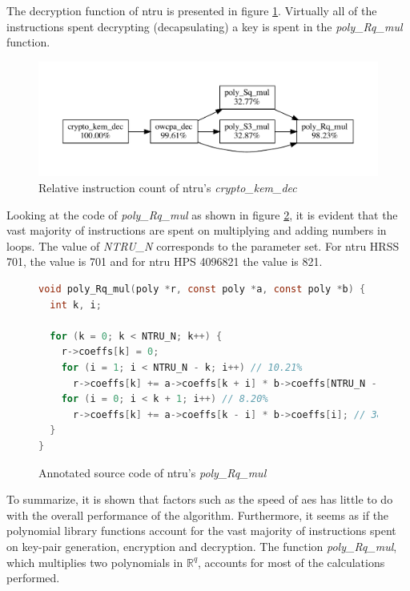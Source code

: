 The decryption function of \gls{ntru} is presented in figure \ref{figure:result:hot-paths:ntru:crypto_kem_dec}. Virtually all of the instructions spent decrypting (decapsulating) a key is spent in the \textit{poly\_Rq\_mul} function.

\begin{figure}[H]
    \centering
    \includegraphics[scale=0.5]{chapters/results/hot-paths/ntru/crypto_kem_dec.pdf}
    \caption{Relative instruction count of \gls{ntru}'s \textit{crypto\_kem\_dec}}
    \label{figure:result:hot-paths:ntru:crypto_kem_dec}
\end{figure}

Looking at the code of \textit{poly\_Rq\_mul} as shown in figure \ref{figure:result:hot-paths:ntru:poly_Rq_mul}, it is evident that the vast majority of instructions are spent on multiplying and adding numbers in loops. The value of \textit{NTRU\_N} corresponds to the parameter set. For \gls{ntru} HRSS 701, the value is 701 and for \gls{ntru} HPS 4096821 the value is 821.

\begin{figure}[H]
    \centering
    \begin{lstlisting}[language=C]
void poly_Rq_mul(poly *r, const poly *a, const poly *b) {
  int k, i;

  for (k = 0; k < NTRU_N; k++) {
    r->coeffs[k] = 0;
    for (i = 1; i < NTRU_N - k; i++) // 10.21%
      r->coeffs[k] += a->coeffs[k + i] * b->coeffs[NTRU_N - i]; // 42.75%
    for (i = 0; i < k + 1; i++) // 8.20%
      r->coeffs[k] += a->coeffs[k - i] * b->coeffs[i]; // 38.79%
  }
}
    \end{lstlisting}
    \caption{Annotated source code of \gls{ntru}'s \textit{poly\_Rq\_mul}}
    \label{figure:result:hot-paths:ntru:poly_Rq_mul}
\end{figure}

To summarize, it is shown that factors such as the speed of \gls{aes} has little to do with the overall performance of the algorithm. Furthermore, it seems as if the polynomial library functions account for the vast majority of instructions spent on key-pair generation, encryption and decryption. The function \textit{poly\_Rq\_mul}, which multiplies two polynomials in $\mathbb{R}^q$, accounts for most of the calculations performed.

